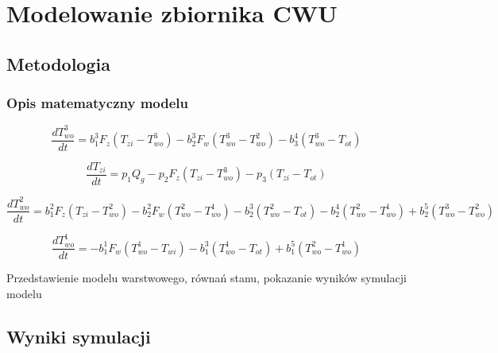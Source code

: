\documentclass[a4paper,twoside,12pt]{book}
\begin{document}
\chapter{Modelowanie zbiornika CWU}
\label{ch:05}
\section{Metodologia}
\subsection{Opis matematyczny modelu}
\begin{equation}
	\frac{dT_{wo}^{3}}{dt} = b_1^3 F_z (T_{zi} - T_{wo}^{3}) - b_2^3 F_w (T_{wo}^{3} - T_{wo}^{2}) - b_3^4 (T_{wo}^{3} - T_{ot})
\end{equation}

\begin{equation}
	\frac{dT_{zi}}{dt} = p_1 Q_g - p_2 F_z (T_{zi} - T_{wo}^{3}) - p_3 (T_{zi} - T_{ot})
\end{equation}

\begin{equation}
	\frac{dT_{wo}^{2}}{dt} = b_1^2 F_z (T_{zi} - T_{wo}^{2}) - b_2^2 F_w (T_{wo}^{2} - T_{wo}^{1}) - b_2^3 (T_{wo}^{2} - T_{ot}) - b_2^4 (T_{wo}^{2} - T_{wo}^{1}) + b_2^5 (T_{wo}^{3} - T_{wo}^{2})
\end{equation}

\begin{equation}
	\frac{dT_{wo}^{1}}{dt} = -b_1^1 F_w (T_{wo}^{1} - T_{wi}) - b_1^3 (T_{wo}^{1} - T_{ot}) + b_1^5 (T_{wo}^{2} - T_{wo}^{1})
\end{equation}

Przedstawienie modelu warstwowego, równań stanu, pokazanie wyników symulacji modelu
\section{Wyniki symulacji}


\end{document}
